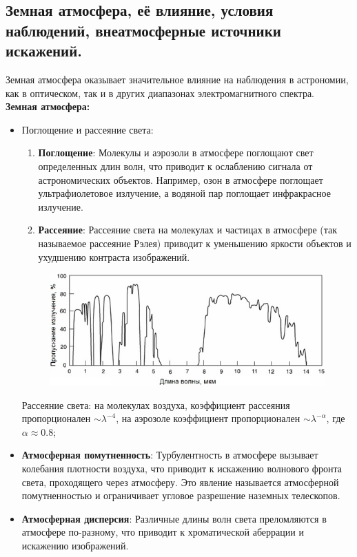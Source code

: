 \documentclass[12pt]{article}
\begin{document}
	\subsection{Земная атмосфера, её влияние, условия наблюдений, внеатмосферные источники искажений.}
	Земная атмосфера оказывает значительное влияние на наблюдения в астрономии, как в оптическом, так и в других диапазонах электромагнитного спектра. \\
	\textbf{Земная атмосфера:}
	\begin{itemize}
		\item Поглощение и рассеяние света:
			\begin{enumerate}
				\item \textbf{Поглощение}: Молекулы и аэрозоли в атмосфере поглощают свет определенных длин волн, что приводит к ослаблению сигнала от астрономических объектов. Например, озон в атмосфере поглощает ультрафиолетовое излучение, а водяной пар поглощает инфракрасное излучение.
				\item \textbf{Рассеяние}: Рассеяние света на молекулах и частицах в атмосфере (так называемое рассеяние Рэлея) приводит к уменьшению яркости объектов и ухудшению контраста изображений.
			\end{enumerate}
			\begin{figure}[h]
				\centering
				\includegraphics[width=0.7\linewidth]{atmosphere}
			\end{figure}
			Рассеяние света: на молекулах воздуха, коэффициент рассеяния пропорционален $\sim \lambda^{-4}$,
		на аэрозоле коэффициент пропорционален $ \sim \lambda^{-\alpha} $, где $ \alpha \approx 0.8$;
		\item \textbf{Атмосферная помутненность}: Турбулентность в атмосфере вызывает колебания плотности воздуха, что приводит к искажению волнового фронта света, проходящего через атмосферу. Это явление называется атмосферной помутненностью и ограничивает угловое разрешение наземных телескопов.
		
		\item \textbf{Атмосферная дисперсия}: Различные длины волн света преломляются в атмосфере по-разному, что приводит к хроматической аберрации и искажению изображений.
	\end{itemize}
\end{document}
